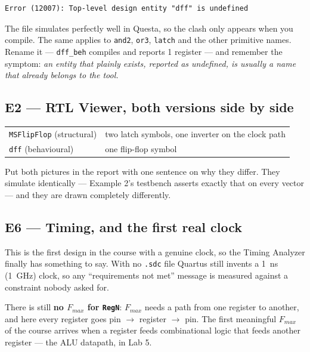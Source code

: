 \documentclass[11pt]{article}
\newcommand{\code}[1]{\texttt{#1}}
\begin{document}
\begin{lstlisting}[language={},numbers=none]
Error (12007): Top-level design entity "dff" is undefined
\end{lstlisting}

The file simulates perfectly well in Questa, so the clash only appears when you
compile. The same applies to \code{and2}, \code{or3}, \code{latch} and the other
primitive names. Rename it --- \code{dff\_beh} compiles and reports 1 register ---
and remember the symptom: \emph{an entity that plainly exists, reported as
undefined, is usually a name that already belongs to the tool.}

\subsection*{E2 --- RTL Viewer, both versions side by side}

\begin{center}
\begin{tabular}{ll}
\toprule
\code{MSFlipFlop} (structural) & two latch symbols, one inverter on the clock path \\
\code{dff} (behavioural) & one flip-flop symbol \\
\bottomrule
\end{tabular}
\end{center}

Put both pictures in the report with one sentence on why they differ. They
simulate identically --- Example 2's testbench asserts exactly that on every
vector --- and they are drawn completely differently.

\subsection*{E6 --- Timing, and the first real clock}

This is the first design in the course with a genuine clock, so the Timing
Analyzer finally has something to say. With no \code{.sdc} file Quartus still
invents a 1~ns (1~GHz) clock, so any ``requirements not met'' message is measured
against a constraint nobody asked for.

There is still \textbf{no $F_{max}$ for \code{RegN}}: $F_{max}$ needs a path from
one register to another, and here every register goes pin $\rightarrow$ register
$\rightarrow$ pin. The first meaningful $F_{max}$ of the course arrives when a
register feeds combinational logic that feeds another register --- the ALU
datapath, in Lab 5.
\end{document}
